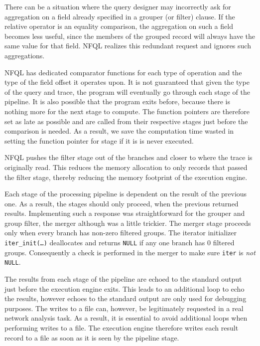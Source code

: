 There can be a situation where the query designer may incorrectly ask for
aggregation on a field already specified in a grouper (or filter) clause. If
the relative operator is an equality comparison, the aggregation on such a
field becomes less useful, since the members of the grouped record will always
have the same value for that field. \ac{NFQL} realizes this redundant request
and ignores such aggregations.

\ac{NFQL} has dedicated comparator functions for each type of operation and
the type of the field offset it operates upon. It is not guaranteed that given
the type of the query and trace, the program will eventually go through each
stage of the pipeline. It is also possible that the program exits before,
because there is nothing more for the next stage to compute. The function
pointers are therefore set as late as possible and are called from their
respective stages just before the comparison is needed.  As a result, we save
the computation time wasted in setting the function pointer for stage if it is
is never executed.

\ac{NFQL} pushes the filter stage out of the branches and closer to where the
trace is originally read. This reduces the memory allocation to only records
that passed the filter stage, thereby reducing the memory footprint of the
execution engine.

Each stage of the processing pipeline is dependent on the result of the
previous one. As a result, the stages should only proceed, when the previous
returned results. Implementing such a response was straightforward for the
grouper and group filter, the merger although was a little trickier.  The
merger stage proceeds only when every branch has non-zero filtered groups.
The iterator initializer \texttt{iter\_init(\ldots)} deallocates and returns
\texttt{NULL} if any one branch has $0$ filtered groups.  Consequently a check
is performed in the merger to make sure \texttt{iter} is \emph{not}
\texttt{NULL}.

The results from each stage of the pipeline are echoed to the standard output
just before the execution engine exits. This leads to an additional loop to
echo the results, however echoes to the standard output are only used for
debugging purposes. The writes to a file can, however, be legitimately
requested in a real network analysis task. As a result, it is essential to
avoid additional loops when performing writes to a file. The execution engine
therefore writes each result record to a file as soon as it is seen by the
pipeline stage.
